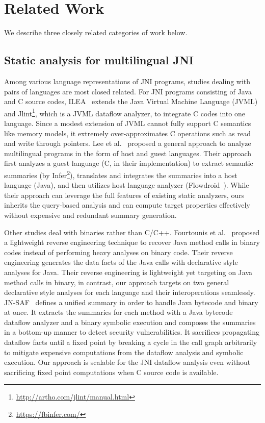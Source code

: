 \section{Related Work}\label{sec:related}
We describe three closely related categories of work below.
\subsection{Static analysis for multilingual JNI}
Among various language representations of JNI programs, studies dealing with
pairs of languages are most closed related.  For JNI programs consisting of
Java and C source codes, ILEA~\cite{ILEA} extends the Java Virtual Machine
Language (JVML) and Jlint\footnote{\url{http://artho.com/jlint/manual.html}}, which is a JVML dataflow analyzer, to integrate C codes into one language.
Since a modest extension of JVML cannot fully support C semantics like memory
models, it extremely over-approximates C operations such as read and write
through pointers.  Lee et al.~\cite{LeeASE20} proposed a general approach to
analyze multilingual programs in the form of host and guest languages.  Their
approach first analyzes a guest language (C, in their implementation) to extract
semantic summaries (by Infer\footnote{\url{https://fbinfer.com/}}), translates
and integrates the summaries into a host language (Java), and then utilizes host
language analyzer (Flowdroid~\cite{Flowdroid}).  While their approach can
leverage the full features of existing static analyzers, ours inherits the
query-based analysis and can compute target properties effectively without
expensive and redundant summary generation.

Other studies deal with binaries rather than C/C++.
Fourtounis et al.~\cite{scanning} proposed a lightweight reverse engineering
technique to recover Java method calls in binary codes instead of performing
heavy analyses on binary code.  Their reverse engineering generates the data
facts of the Java calls with declarative style analyses for Java.
Their reverse engineering is lightweight yet targeting on Java method calls in
binary, in contrast, our approach targets on two general declarative style
analyses for each language and their interoperations seamlessly.
JN-SAF~\cite{JN-SAF} defines a unified summary in order to handle Java bytecode
and binary at once.  It extracts the summaries for each method with a Java
bytecode dataflow analyzer and a binary symbolic execution and composes the
summaries in a bottom-up manner to detect security vulnerabilities.
It sacrifices propagating dataflow facts until a fixed point by breaking a cycle
in the call graph arbitrarily to mitigate expensive computations from the
dataflow analysis and symbolic execution.  Our approach is scalable for the JNI
dataflow analysis even without sacrificing fixed point computations when C
source code is available.

